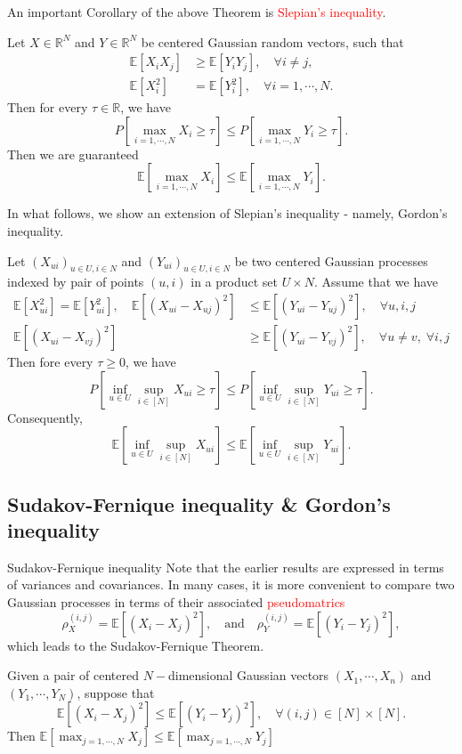 \documentclass[10pt,handout,english]{beamer}
\newcommand{\E}{\mathbb{E}}
\newcommand{\R}{\mathbb{R}}
\begin{document}
\begin{frame}
An important Corollary of the above Theorem is \textcolor{red}{Slepian's inequality}.
\begin{corollary}
Let $X\in\R^N$ and $Y\in\R^N$ be centered Gaussian random vectors, such that
\begin{align*}
\E[X_iX_j]&\geq\E[Y_iY_j],\quad \forall i\neq j,\\
\E[X_i^2]&=\E[Y_i^2],\quad\forall i=1,\cdots,N.
\end{align*}
Then for every $\tau\in\R$, we have
\[
P\left[\max_{i=1,\cdots,N}X_i\geq \tau\right]\leq P\left[\max_{i=1,\cdots,N}Y_i\geq \tau\right].
\]
Then we are guaranteed
\[
\E\left[\max_{i=1,\cdots,N}X_i\right]\leq\E\left[\max_{i=1,\cdots,N}Y_i\right]. 
\]
\end{corollary}
In what follows, we show an extension of Slepian's inequality - namely, Gordon's inequality.  
\end{frame}

\begin{frame}
\begin{Corollary}
Let $\left(X_{ui}\right)_{u\in U,i\in N}$ and $\left(Y_{ui}\right)_{u\in U,i\in N}$ be two centered Gaussian processes indexed by pair of points $(u,i)$ in a product set $U\times N$. Assume that we have\justifying
\begin{align*}
\E[X_{ui}^2]=\E[Y_{ui}^2],\quad\E[(X_{ui}-X_{uj})^2]&\leq\E[(Y_{ui}-Y_{uj})^2],\quad\forall u,i,j\\
\E[(X_{ui}-X_{vj})^2]&\geq\E[(Y_{ui}-Y_{vj})^2],\quad\forall u\neq v,\;\forall i,j
\end{align*}
Then fore every $\tau\geq 0$, we have
\[
P\left[\inf_{u\in U}\sup_{i\in [N]}X_{ui}\geq\tau\right]\leq P\left[\inf_{u\in U}\sup_{i\in [N]}Y_{ui}\geq\tau\right].
\]
Consequently,
\[
\E\left[\inf_{u\in U}\sup_{i\in [N]}X_{ui}\right]\leq \E\left[\inf_{u\in U}\sup_{i\in [N]}Y_{ui}\right]. 
\]
\end{Corollary}
\end{frame}
\subsection{Sudakov-Fernique inequality \& Gordon's inequality}
\begin{frame}{Sudakov-Fernique inequality}
Note that the earlier results are expressed in terms of variances and covariances. In many cases, it is more convenient to compare two Gaussian processes in terms of their associated \textcolor{red}{pseudomatrics}
\[
\rho_X^{(i,j)}=\E\left[(X_i-X_j)^2\right],\quad\text{and}\quad \rho_Y^{(i,j)}=\E\left[(Y_i-Y_j)^2\right],
\] 
which leads to the Sudakov-Fernique Theorem.
\begin{Theorem}
Given a pair of centered $N-$dimensional Gaussian vectors $(X_1,\cdots,X_n)$ and $(Y_1,\cdots,Y_N)$, suppose that
\[
\E[(X_i-X_j)^2]\leq \E[(Y_i-Y_j)^2],\quad\forall (i,j)\in[N]\times[N]. 
\]
Then $\E[\max_{j=1,\cdots,N}X_j]\leq\E[\max_{j=1,\cdots,N}Y_j] $
\end{Theorem}
\end{frame}
\end{document}
